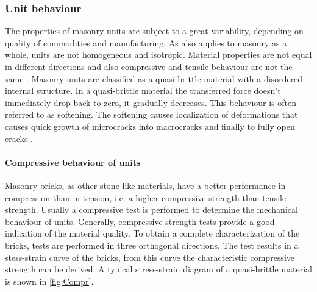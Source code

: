 \subsubsection{Unit behaviour}
The properties of masonry units are subject to a great variability, depending on quality of commodities and manufacturing. As also applies to masonry as a whole, units are not homogeneous and isotropic. Material properties are not equal in different directions and also compressive and tensile behaviour are not the same \cite{barraza2012numerical}. Masonry units are classified as a quasi-brittle material with a disordered internal structure. In a quasi-brittle material the transferred force doesn't immediately drop back to zero, it gradually decreases. This behaviour is often referred to as softening. The softening causes localization of deformations that causes quick growth of microcracks into macrocracks and finally to fully open cracks \cite{bakeer2009collapse}.


\paragraph{Compressive behaviour of units}
Masonry bricks, as other stone like materials, have a better performance in compression than in tension, i.e. a higher compressive strength than tensile strength. Usually a compressive test is performed to determine the mechanical behaviour of units. Generally, compressive strength tests provide a good indication of the material quality. To obtain a complete characterization of the bricks, tests are performed in three orthogonal directions. The test results in a stess-strain curve of the bricks, from this curve the characteristic compressive strength can be derived. A typical stress-strain diagram of a quasi-brittle material is shown in \autoref{fig:Compr}.

